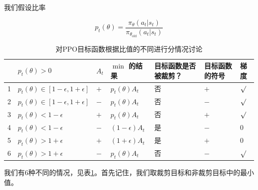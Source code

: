 \documentclass[lang=cn,newtx,10pt,scheme=chinese]{elegantbook}
\begin{document}
我们假设比率

\begin{equation}
p_t(\theta) = \frac{\pi_\theta(a_t|s_t)}{\pi_{\theta_{\text{old}}}(a_t|s_t)}
\end{equation}


\begin{table}[!ht]
\centering
\begin{tabular}{|l|l|l|l|l|l|l|}
\hline
\rowcolor[HTML]{96FFFB}
  & $p_t(\theta)>0$                         & $A_t$ & $\min$ 的结果     & 目标函数是否被裁剪？ & 目标函数的符号 & 梯度      \\ \hline
1 & $p_t(\theta)\in[1-\epsilon,1+\epsilon]$ & $+$   & $p_t(\theta)A_t$  & 否                   & $+$            & $\surd$   \\ \hline
2 & $p_t(\theta)\in[1-\epsilon,1+\epsilon]$ & $-$   & $p_t(\theta)A_t$  & 否                   & $-$            & $\surd$   \\ \hline
3 & $p_t(\theta)<1-\epsilon$                & $+$   & $p_t(\theta)A_t$  & 否                   & $+$            & $\surd$   \\ \hline
4 & $p_t(\theta)<1-\epsilon$                & $-$   & $(1-\epsilon)A_t$ & 是                   & $-$            & $0$       \\ \hline
5 & $p_t(\theta)>1+\epsilon$                & $+$   & $(1+\epsilon)A_t$ & 是                   & $+$            & $0$       \\ \hline
6 & $p_t(\theta)>1+\epsilon$                & $-$   & $p_t(\theta)A_t$  & 否                   & $-$            & $\surd$   \\ \hline
\end{tabular}
\caption{对PPO目标函数根据比值的不同进行分情况讨论}\label{tbl:ppo-ratio}
\end{table}

我们有6种不同的情况，见表\ref{tbl:ppo-ratio}。首先记住，我们取裁剪目标和非裁剪目标中的最小值。
\end{document}
